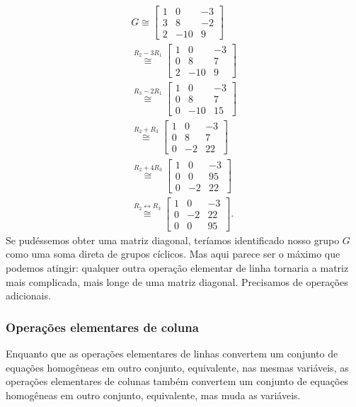    	\begin{align*} 
        	G \cong \begin{bmatrix}
        	1 & 0 & -3 \\
        	3 & 8 & -2 \\
        	2 & -10 & 9
        	\end{bmatrix} \\ \stackrel{R_2 - 3R_1}{\cong} \begin{bmatrix}
        	1 & 0 & -3 \\
        	0 & 8 & 7 \\
        	2 & -10 & 9
        	\end{bmatrix} \\ \stackrel{R_3 - 2R_1}{\cong} \begin{bmatrix}
        	1 & 0 & -3 \\
        	0 & 8 & 7 \\
        	0 & -10 & 15
        	\end{bmatrix} \\ \stackrel{R_2 + R_3}{\cong} \begin{bmatrix}
        	1 & 0 & -3 \\
        	0 & 8 & 7 \\
        	0 & -2 & 22
        	\end{bmatrix} \\ \stackrel{R_2 + 4R_3}{\cong} \begin{bmatrix}
        	1 & 0 & -3 \\
        	0 & 0 & 95 \\
        	0 & -2 & 22
        	\end{bmatrix} \\ \stackrel{R_2\leftrightarrow R_3}{\cong} \begin{bmatrix}
        	1 & 0 & -3 \\
        	0 & -2 & 22 \\
        	0 & 0 & 95 
        	\end{bmatrix}.
    	\end{align*}
    	Se pudéssemos obter uma matriz diagonal, teríamos identificado nosso grupo $G$ 
    	como uma soma direta de grupos cíclicos. Mas aqui parece ser o máximo que podemos atingir: qualquer 
    	outra operação elementar de linha tornaria a matriz mais complicada, mais longe de uma matriz diagonal.
    	Precisamos de operações adicionais.
    	
    	\subsubsection{Operações elementares de coluna}
    	Enquanto que as operações elementares de linhas convertem um conjunto de equações homogêneas em 
    	outro conjunto, equivalente, nas mesmas variáveis, as operações elementares de colunas também 
    	convertem um conjunto de  equações homogêneas em outro conjunto, equivalente, mas muda as variáveis.
    	
